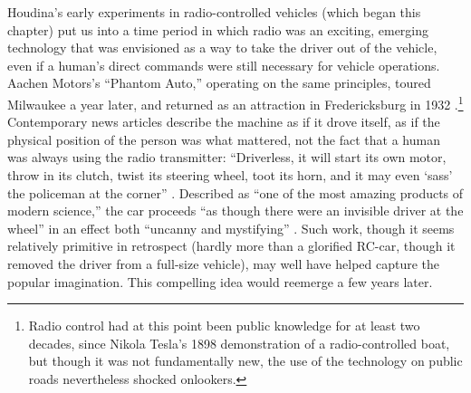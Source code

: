 Houdina's early experiments in radio-controlled vehicles (which began
this chapter) put us into a time period in which radio was an
exciting, emerging technology that was envisioned as a way to take
the driver out of the vehicle, even if a human's direct commands were
still necessary for vehicle operations. Aachen Motors's ``Phantom
Auto,'' operating on the same principles, toured Milwaukee a year
later, \cite{phantomAuto} and returned as an attraction in
Fredericksburg in 1932 \cite{phantomAuto2}.\footnote{Radio control had
  at this point been public knowledge for at least two 
decades, since Nikola Tesla's 1898 demonstration of a radio-controlled
boat, but though it was not fundamentally new, the use of the
technology on public roads nevertheless shocked onlookers.} Contemporary news articles
describe the machine as if it drove itself, 
as if the physical position of the person was what mattered, not the
fact that a human was always using the radio transmitter:  ``Driverless,
it will start its own motor, throw in its clutch, twist its steering
wheel, toot its horn, and it may even `sass' the policeman at the
corner'' \cite{phantomAuto}. Described as ``one of the most amazing products of
modern science,'' the 
car proceeds ``as though there were an invisible driver at the wheel''
in an effect both ``uncanny and mystifying'' \cite{phantomAuto2}. Such work,
though it seems relatively primitive in retrospect (hardly more than a
glorified RC-car, though it removed the driver from a full-size vehicle), may well have
helped capture the popular imagination. This compelling idea would reemerge
a few years later.



